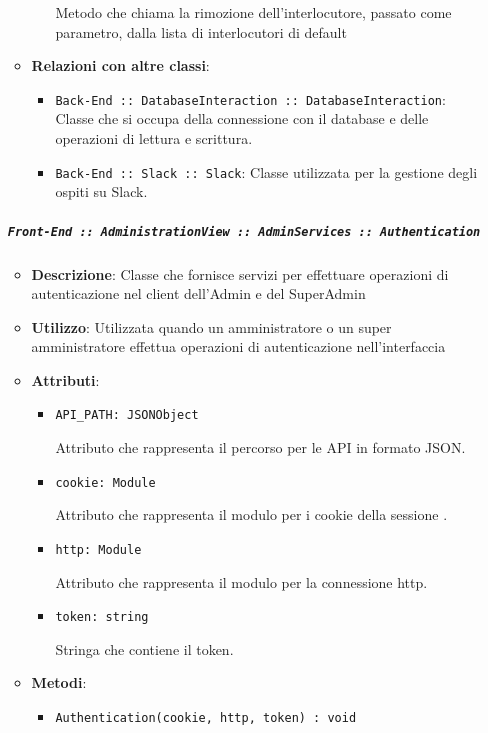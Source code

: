 \documentclass[../DefinizioneDiProdotto.tex]{subfiles}
\begin{document}
\begin{itemize}
\begin{itemize}
\begin{itemize}
	 Metodo che chiama la rimozione dell'interlocutore, passato come parametro, dalla lista di interlocutori di default
	\end{itemize}\vspace{0.5em}
	\item \textbf{Relazioni con altre classi}:
	\begin{itemize}
	\item \texttt{Back-End :: DatabaseInteraction :: DatabaseInteraction}: Classe che si occupa della connessione con il database e delle operazioni di lettura e scrittura.
	\item \texttt{Back-End :: Slack :: Slack}: Classe utilizzata per la gestione degli ospiti su Slack.
	\end{itemize}
	\end{itemize}\subparagraph{\texttt{Front-End :: AdministrationView :: AdminServices :: Authentication}}
	\begin{itemize}\item \textbf{Descrizione}: Classe che fornisce servizi per effettuare operazioni di autenticazione nel client dell'Admin e del SuperAdmin
	\item \textbf{Utilizzo}: Utilizzata quando un amministratore o un super amministratore effettua operazioni di autenticazione nell'interfaccia
	\item \textbf{Attributi}:
	\begin{itemize}
	\item \texttt{API\_PATH: JSONObject}\

	 Attributo che rappresenta il percorso per le API in formato JSON.
	\end{itemize}
	\begin{itemize}
	\item \texttt{cookie: Module}\

	 Attributo che rappresenta il modulo per i cookie della sessione .
	\end{itemize}
	\begin{itemize}
	\item \texttt{http: Module}\

	 Attributo che rappresenta il modulo per la connessione http.
	\end{itemize}
	\begin{itemize}
	\item \texttt{token: string}\

	 Stringa che contiene il token.
	\end{itemize}
	\item \textbf{Metodi}:
	\begin{itemize}
	\item \texttt{Authentication(cookie, http, token) : void}\


\end{itemize}
\end{itemize}
\end{itemize}
\end{document}
